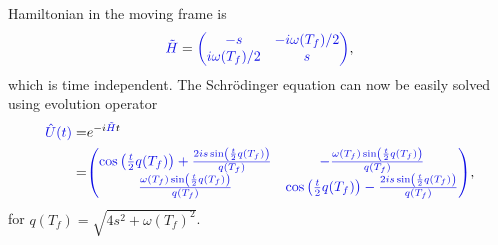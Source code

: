 Hamiltonian in the moving frame is
\begin{equation}
    \textcolor{blue}{\tilde H}=\textcolor{blue}{\begin{pmatrix}
        -s&-i\omega(T_f)/2\\
        i\omega(T_f)/2&s
    \end{pmatrix}},
\end{equation}
which is time independent. The Schr\"odinger equation can now be easily solved using evolution operator
\begin{equation}
    \begin{split}
        \textcolor{blue}{\UU(t)}=&e^{-i\textcolor{blue}{\tilde H}t}\\
        =&\textcolor{blue}{\begin{pmatrix}
            \cos \left(\frac{t}{2} q(T_f)\right)+\frac{2 i s \sin \left(\frac{t}{2} q(T_f)\right)}{q(T_f)} & -\frac{\omega(T_f)  \sin \left(\frac{t}{2} q(T_f)\right)}{q(T_f)} \\
            \frac{\omega(T_f)  \sin \left(\frac{t}{2} q(T_f)\right)}{q(T_f)} & \cos \left(\frac{t}{2} q(T_f)\right)-\frac{2 i s \sin \left(\frac{t}{2} q(T_f)\right)}{q(T_f)} \\
        \end{pmatrix}},
    \end{split}
    \label{eq:evolutionBlue}
\end{equation}
for $q(T_f)=\sqrt{4 s^2+\omega(T_f) ^2}$.

